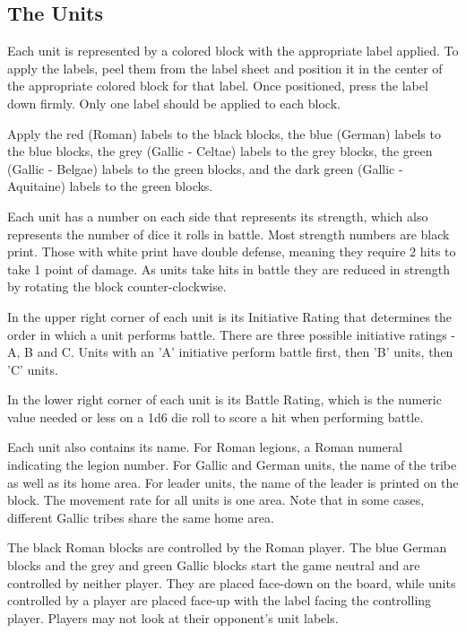 \par
\subsection{The Units}
Each unit is represented by a colored block with the appropriate label applied. To apply the labels, peel them from the label sheet and position it in the center of the appropriate colored block for that label. Once positioned, press the label down firmly. Only one label should be applied to each block.

Apply the red (Roman) labels to the black blocks, the blue (German) labels to the blue blocks, the grey (Gallic - Celtae) labels to the grey blocks, the green (Gallic - Belgae) labels to the green blocks, and the dark green (Gallic - Aquitaine) labels to the green blocks.

Each unit has a number on each side that represents its strength, which also represents the number of dice it rolls in battle. Most strength numbers are black print. Those with white print have double defense, meaning they require 2 hits to take 1 point of damage. As units take hits in battle they are reduced in strength by rotating the block counter-clockwise.

In the upper right corner of each unit is its Initiative Rating that determines the order in which a unit performs battle. There are three possible initiative ratings - A, B and C. Units with an 'A' initiative perform battle first, then 'B' units, then 'C' units.

In the lower right corner of each unit is its Battle Rating, which is the numeric value needed or less on a 1d6 die roll to score a hit when performing battle.

Each unit also contains its name. For Roman legions, a Roman numeral indicating the legion number. For Gallic and German units, the name of the tribe as well as its home area. For leader units, the name of the leader is printed on the block. The movement rate for all units is one area. Note that in some cases, different Gallic tribes share the same home area.

The black Roman blocks are controlled by the Roman player. The blue German blocks and the grey and green Gallic blocks start the game neutral and are controlled by neither player. They are placed face-down on the board, while units controlled by a player are placed face-up with the label facing the controlling player. Players may not look at their opponent's unit labels.

